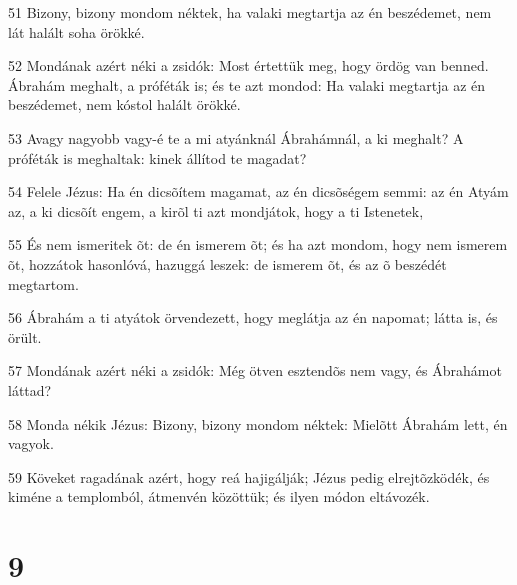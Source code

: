 \par 51 Bizony, bizony mondom néktek, ha valaki megtartja az én beszédemet, nem lát halált soha örökké.
\par 52 Mondának azért néki a zsidók: Most értettük meg, hogy ördög van benned. Ábrahám meghalt, a próféták is; és te azt mondod: Ha valaki megtartja az én beszédemet, nem kóstol halált örökké.
\par 53 Avagy nagyobb vagy-é te a mi atyánknál Ábrahámnál, a ki meghalt? A próféták is meghaltak: kinek állítod te magadat?
\par 54 Felele Jézus: Ha én dicsõítem magamat, az én dicsõségem semmi: az én Atyám az, a ki dicsõít engem, a kirõl ti azt mondjátok, hogy a ti Istenetek,
\par 55 És nem ismeritek õt: de én ismerem õt; és ha azt mondom, hogy nem ismerem õt, hozzátok hasonlóvá, hazuggá leszek: de ismerem õt, és az õ beszédét megtartom.
\par 56 Ábrahám a ti atyátok örvendezett, hogy meglátja az én napomat; látta is, és örült.
\par 57 Mondának azért néki a zsidók: Még ötven esztendõs nem vagy, és Ábrahámot láttad?
\par 58 Monda nékik Jézus: Bizony, bizony mondom néktek: Mielõtt Ábrahám lett, én vagyok.
\par 59 Köveket ragadának azért, hogy reá hajigálják; Jézus pedig elrejtõzködék, és kiméne a templomból, átmenvén közöttük; és ilyen módon eltávozék.

\chapter{9}

